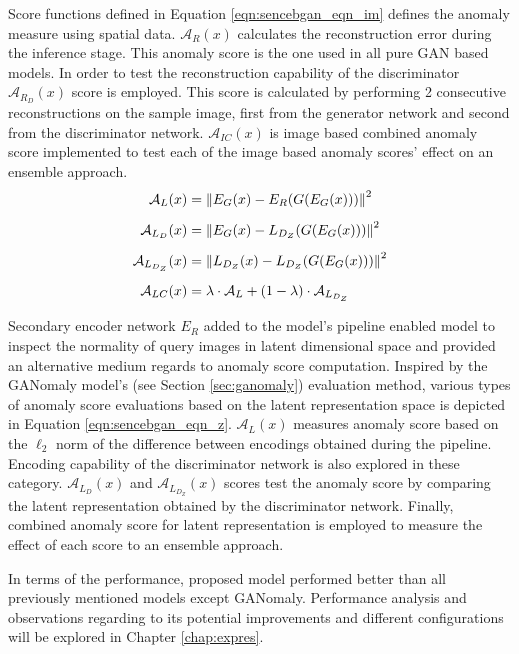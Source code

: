 Score functions defined in Equation \ref{eqn:sencebgan_eqn_im} defines the anomaly measure using
spatial data. $\mathcal{A}_{R}(x)$ calculates the reconstruction error during the inference stage.
This anomaly score is the one used in all pure GAN based models. In order to test the reconstruction
capability of the discriminator $\mathcal{A}_{R_{D}}(x)$ score is employed. This score is calculated
by performing 2 consecutive reconstructions on the sample image, first from the generator network 
and second from the discriminator network. $\mathcal{A}_{IC}(x)$ is image based combined anomaly 
score implemented to test each of the image based anomaly scores' effect on an ensemble approach.
\begin{equation}
	\label{eqn:sencebgan_eqn_z}
	\begin{aligned}
	\mathcal{A}_{L}(x) & = \left\lVert E_{G}(x) - E_{R}(G(E_{G}(x)))\right\rVert^2  \\[5pt]
	\mathcal{A}_{L_{D}}(x) & = \left\lVert E_{G}(x) - L_{D_{Z}}(G(E_{G}(x)))\right\rVert^2 \\[5pt]
	\mathcal{A}_{L_{D_{Z}}}(x) & = \left\lVert L_{D_{Z}}(x) - L_{D_{Z}}(G(E_{G}(x)))\right\rVert^2 \\[5pt]
	\mathcal{A}_{LC}(x) & = \lambda \cdot \mathcal{A}_{L} + (1 - \lambda) \cdot \mathcal{A}_{L_{D_{Z}}} 
	\end{aligned}
\end{equation}

Secondary encoder network $E_{R}$ added to the model's pipeline enabled model to 
inspect the normality of query images in latent dimensional space and provided an alternative medium
regards to anomaly score computation. Inspired by the GANomaly model's (see Section \ref{sec:ganomaly})
evaluation method, various types of anomaly score evaluations based on the latent representation
space is depicted in Equation \ref{eqn:sencebgan_eqn_z}. $\mathcal{A}_{L}(x)$ measures anomaly score
based on the $\ell_{2}$ norm of the difference between encodings obtained during the pipeline.
Encoding capability of the discriminator network is also explored in these category.
$\mathcal{A}_{L_{D}}(x)$ and $\mathcal{A}_{L_{D_{Z}}}(x)$ scores test the anomaly score by
comparing the latent representation obtained by the discriminator network. Finally, combined anomaly
score for latent representation is employed to measure the effect of each score to an ensemble
approach. 
 
In terms of the performance, proposed model performed better than all previously mentioned models
except GANomaly. Performance analysis and observations regarding to its potential improvements and
different configurations will be explored in Chapter \ref{chap:expres}.


\endgroup
